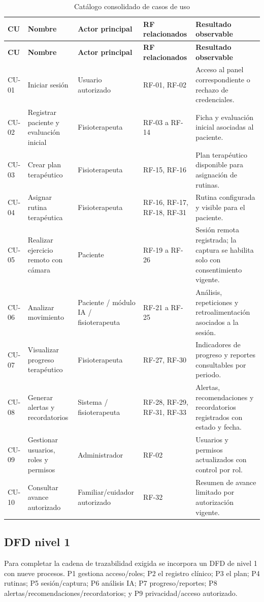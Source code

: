\documentclass[12pt,a4paper]{article}
\begin{document}
\small
\begin{longtable}{p{}p{}p{}p{}p{}}
\caption{Catálogo consolidado de casos de uso}\\
\toprule
\textbf{CU}&\textbf{Nombre}&\textbf{Actor principal}&\textbf{RF relacionados}&\textbf{Resultado observable}\\
\midrule\endfirsthead
\toprule
\textbf{CU}&\textbf{Nombre}&\textbf{Actor principal}&\textbf{RF relacionados}&\textbf{Resultado observable}\\
\midrule\endhead
CU-01 & Iniciar sesión & Usuario autorizado & RF-01, RF-02 & Acceso al panel correspondiente o rechazo de credenciales. \\
CU-02 & Registrar paciente y evaluación inicial & Fisioterapeuta & RF-03 a RF-14 & Ficha y evaluación inicial asociadas al paciente. \\
CU-03 & Crear plan terapéutico & Fisioterapeuta & RF-15, RF-16 & Plan terapéutico disponible para asignación de rutinas. \\
CU-04 & Asignar rutina terapéutica & Fisioterapeuta & RF-16, RF-17, RF-18, RF-31 & Rutina configurada y visible para el paciente. \\
CU-05 & Realizar ejercicio remoto con cámara & Paciente & RF-19 a RF-26 & Sesión remota registrada; la captura se habilita solo con consentimiento vigente. \\
CU-06 & Analizar movimiento & Paciente / módulo IA / fisioterapeuta & RF-21 a RF-25 & Análisis, repeticiones y retroalimentación asociados a la sesión. \\
CU-07 & Visualizar progreso terapéutico & Fisioterapeuta & RF-27, RF-30 & Indicadores de progreso y reportes consultables por periodo. \\
CU-08 & Generar alertas y recordatorios & Sistema / fisioterapeuta & RF-28, RF-29, RF-31, RF-33 & Alertas, recomendaciones y recordatorios registrados con estado y fecha. \\
CU-09 & Gestionar usuarios, roles y permisos & Administrador & RF-02 & Usuarios y permisos actualizados con control por rol. \\
CU-10 & Consultar avance autorizado & Familiar/cuidador autorizado & RF-32 & Resumen de avance limitado por autorización vigente. \\
\bottomrule\end{longtable}\normalsize

\subsection{DFD nivel 1}
Para completar la cadena de trazabilidad exigida se incorpora un DFD de nivel 1 con nueve procesos. P1 gestiona acceso/roles; P2 el registro clínico; P3 el plan; P4 rutinas; P5 sesión/captura; P6 análisis IA; P7 progreso/reportes; P8 alertas/recomendaciones/recordatorios; y P9 privacidad/acceso autorizado.
\end{document}
